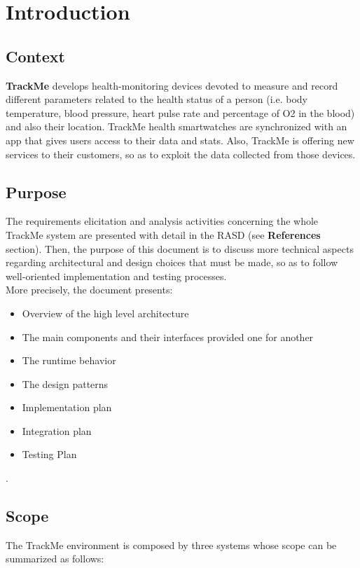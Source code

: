 \documentclass[a4paper, hidelinks, 12pt]{report}
\begin{document}
	\chapter{Introduction}
	\section{Context}
	\textbf{TrackMe} develops health-monitoring devices devoted to measure and record different parameters related to the health status of a person (i.e. body temperature, blood pressure, heart pulse rate and percentage of O2 in the blood) and also their location. TrackMe health smartwatches are synchronized with an app that gives users access to their data and stats. Also, TrackMe is offering new services to their customers, so as to exploit the data collected from those devices. 
	
	\section{Purpose}
	The requirements elicitation and analysis activities concerning the whole TrackMe system are presented with detail in the RASD (see \textbf{References} section). Then, the purpose of this document is to discuss more technical aspects regarding architectural and design choices that must be made, so as to follow well-oriented implementation and testing processes. \\
		
	More precisely, the document presents:
\begin{itemize}
		\item{}Overview of the high level architecture
		\item{}The main components and their interfaces provided one for another
		\item{}The runtime behavior
		\item{}The design patterns
		\item{} Implementation plan
		\item{}Integration plan
		\item{}Testing Plan
	\end{itemize}.
		
	\section{Scope}
	The TrackMe environment is composed by three systems whose scope can be summarized as follows: \\
	
\end{document}
